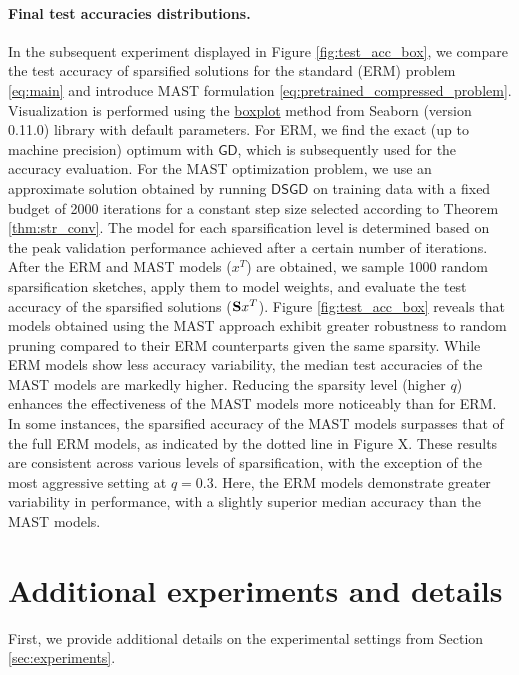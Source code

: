 \documentclass{article}
\theoremstyle{plain}
\newcommand{\mS}{{\bf S}}
\theoremstyle{plain}
\theoremstyle{definition}
\theoremstyle{remark}
\begin{document}
\paragraph{Final test accuracies distributions.}
In the subsequent experiment displayed in Figure \ref{fig:test_acc_box}, we compare the test accuracy of sparsified solutions for the standard (ERM) problem \eqref{eq:main} and introduce MAST formulation \eqref{eq:pretrained_compressed_problem}.
Visualization is performed using the \href{https://seaborn.pydata.org/archive/0.11/generated/seaborn.boxplot.html#seaborn.boxplot}{boxplot} method from Seaborn (version 0.11.0) library \citep{Waskom2021} with default parameters.
For ERM, we find the exact (up to machine precision) optimum with $\mathsf{GD}$, which is subsequently used for the accuracy evaluation. For the MAST optimization problem, we use an approximate solution obtained by running $\mathsf{DSGD}$ on training data with a fixed budget of 2000 iterations for a constant step size selected according to Theorem \eqref{thm:str_conv}. The model for each sparsification level is determined based on the peak validation performance achieved after a certain number of iterations.
After the ERM and MAST models ($x^T$) are obtained, we sample 1000 random sparsification sketches, apply them to model weights, and evaluate the test accuracy of the sparsified solutions ($\mS x^T$).
Figure \ref{fig:test_acc_box} reveals that models obtained using the MAST approach exhibit greater robustness to random pruning compared to their ERM counterparts given the same sparsity. While ERM models show less accuracy variability, the median test accuracies of the  MAST models are markedly higher.
Reducing the sparsity level (higher $q$) enhances the effectiveness of the MAST models more noticeably than for ERM.
In some instances, the sparsified accuracy of the MAST models surpasses that of the full ERM models, as indicated by the dotted line in Figure X.
These results are consistent across various levels of sparsification, with the exception of the most aggressive setting at $q=0.3$. Here, the ERM models demonstrate greater variability in performance, with a slightly superior median accuracy than the MAST models.

\fi

\section{Additional experiments and details} \label{apdx:experiments}

First, we provide additional details on the experimental settings from Section \ref{sec:experiments}.
\end{document}
